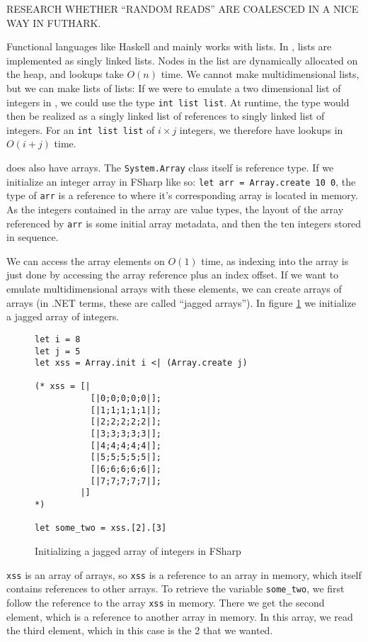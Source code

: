 RESEARCH WHETHER ``RANDOM READS'' ARE COALESCED IN A NICE WAY IN FUTHARK.

Functional languages like Haskell and \fsharp{} mainly works with lists.
In \fsharp{}, lists are implemented as singly linked lists. Nodes in the
list are dynamically allocated on the heap, and lookups take $O(n)$ time.
We cannot make multidimensional lists, but we can make lists of lists: If we
were to emulate a two dimensional list of integers in \fsharp{}, we could use
the type \texttt{int list list}. At runtime, the type would then be realized as
a singly linked list of references to singly linked list of integers.
For an \texttt{int list list} of $i \times j$ integers, we therefore have
lookups in $O(i+j)$ time.

\fsharp{} does also have arrays. The \texttt{System.Array} class itself is reference
type. If we initialize an integer array in FSharp like so: \texttt{let arr =
Array.create 10 0}, the type of \texttt{arr} is a reference to where it's corresponding
array is located in memory. As the integers contained in the array are value
types, the layout of the array referenced by \texttt{arr} is some initial array
metadata, and then the ten integers stored in sequence.

We can access the array elements on $O(1)$ time, as indexing into the array is
just done by accessing the array reference plus an index offset.
If we want to emulate multidimensional arrays with these elements, we can create
arrays of arrays (in .NET terms, these are called ``jagged arrays''). In figure
\ref{fig:jaggedarrayfsharp} we initialize a jagged array of integers.

\begin{figure}[h]
  \centering
\begin{verbatim}
let i = 8
let j = 5
let xss = Array.init i <| (Array.create j) 
  
(* xss = [|
           [|0;0;0;0;0|];
           [|1;1;1;1;1|];
           [|2;2;2;2;2|];
           [|3;3;3;3;3|];
           [|4;4;4;4;4|];
           [|5;5;5;5;5|];
           [|6;6;6;6;6|];
           [|7;7;7;7;7|];
         |]
*) 

let some_two = xss.[2].[3]

\end{verbatim}
  \caption{Initializing a jagged array of integers in FSharp}
  \label{fig:jaggedarrayfsharp}
\end{figure}

\texttt{xss} is an array of arrays, so \texttt{xss} is a reference to an array
in memory, which itself contains references to other arrays.
To retrieve the variable \texttt{some\_two}, we first follow the reference to
the array \texttt{xss} in memory. There we get the second element, which is a
reference to another array in memory. In this array, we read the third element,
which in this case is the 2 that we wanted.


